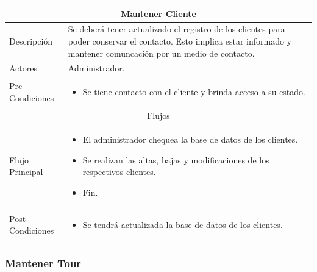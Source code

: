 \documentclass[12pt,a4paper]{article}
\newenvironment{myitemize}
{\begin{itemize}[leftmargin=*,noitemsep,topsep=0pt]}{\end{itemize}}
\newenvironment{caseuse}
{\begin{center}\begin{tabular}{|l|p{10cm}|}}{\end{tabular}\end{center}}
\begin{document}
			\begin{caseuse}
				\hline
				\multicolumn{2}{|c|}{Mantener Cliente} \\ \hline

				Descripción & Se deberá tener actualizado el registro de los clientes para poder conservar el contacto. Esto implica estar informado y mantener comuncación por un medio de contacto. \\ \hline

				Actores & Administrador. \\ \hline

				Pre-Condiciones & 
					\begin{myitemize}
						\item Se tiene contacto con el cliente y brinda acceso a su estado.
					\end{myitemize} \\ \hline

				\multicolumn{2}{|c|}{Flujos} \\ \hline

				Flujo Principal &
					\begin{myitemize}
						\item El administrador chequea la base de datos de los clientes.
						\item Se realizan las altas, bajas y modificaciones de los respectivos clientes.
						\item Fin.
					\end{myitemize} \\ \hline

				Post-Condiciones &
					\begin{myitemize}
						\item Se tendrá actualizada la base de datos de los clientes.
					\end{myitemize}\\ \hline
			\end{caseuse}

	\subsubsection{Mantener Tour}
\end{document}
